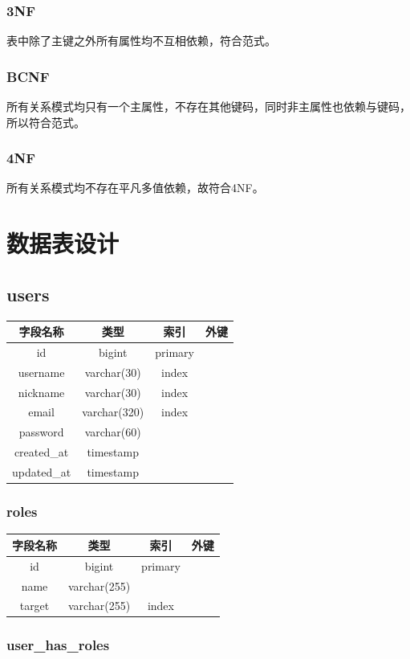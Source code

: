 \documentclass{ctexrep}
\begin{document}
\subsubsection{3NF}

表中除了主键之外所有属性均不互相依赖，符合范式。

\subsubsection{BCNF}

所有关系模式均只有一个主属性，不存在其他键码，同时非主属性也依赖与键码，所以符合范式。
\subsubsection{4NF}

所有关系模式均不存在平凡多值依赖，故符合4NF。

\section{数据表设计}

\subsection{users}

\begin{longtable}[]{@{}cccc@{}}
\toprule
字段名称 & 类型 & 索引 & 外键\tabularnewline
\midrule
id & bigint & primary &\tabularnewline
username & varchar(30) & index &\tabularnewline
nickname & varchar(30) & index &\tabularnewline
email & varchar(320) & index &\tabularnewline
password & varchar(60) & &\tabularnewline
created_at & timestamp & &\tabularnewline
updated_at & timestamp & &\tabularnewline
\bottomrule
\end{longtable}

\subsubsection{roles}

\begin{longtable}[]{@{}cccc@{}}
\toprule
字段名称 & 类型 & 索引 & 外键\tabularnewline
\midrule
id & bigint & primary &\tabularnewline
name & varchar(255) & &\tabularnewline
target & varchar(255) & index &\tabularnewline
\bottomrule
\end{longtable}

\subsubsection{user_has_roles}
\end{document}
